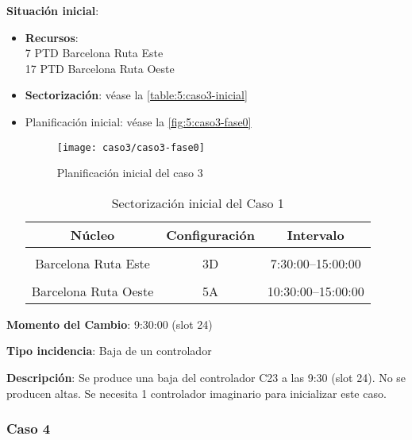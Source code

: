 \textbf{Situación inicial}:
\begin{itemize}[label={}]
	
	\item \textbf{Recursos}: \\
	7 PTD Barcelona Ruta Este \\
	17 PTD Barcelona Ruta Oeste
	
	
	\item \textbf{Sectorización}: véase la \autoref{table:5:caso3-inicial}
	
	\item Planificación inicial: véase la \autoref{fig:5:caso3-fase0}
	
	\begin{figure}[!h]
		\centering
		\texttt{[image: caso3/caso3-fase0]}
		\caption{Planificación inicial del caso 3}
		\label{fig:5:caso3-fase0}
	\end{figure}

	\begin{table}[h]
		\centering
		\caption{Sectorización inicial del Caso 1}
		\begin{tabular}{ccc}
			\hline
			\textbf{Núcleo}      & \textbf{Configuración} & \textbf{Intervalo}   \\ \hline
			\multicolumn{1}{l}{} & \multicolumn{1}{l}{}   & \multicolumn{1}{l}{} \\
			Barcelona Ruta Este  & 3D                     & 7:30:00--15:00:00    \\
			\multicolumn{1}{l}{} & \multicolumn{1}{l}{}   & \multicolumn{1}{l}{} \\
			Barcelona Ruta Oeste & 5A                     & 10:30:00--15:00:00   \\ \hline
		\end{tabular}
		\label{table:5:caso3-inicial}
	\end{table}
	
\end{itemize}

\textbf{Momento del Cambio}: 9:30:00 (slot 24)

\textbf{Tipo incidencia}: Baja de un controlador

\textbf{Descripción}: Se produce una baja del controlador C23 a las 9:30 (slot 24). No se producen altas. Se necesita 1 controlador imaginario para inicializar este caso.


\subsubsection{Caso 4}

